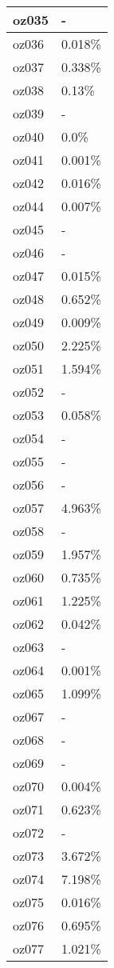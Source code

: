 \documentclass{article}%
\begin{document}
\begin{longtabu}{X[l] X[r]}
\hline%
oz035&{-}\\%
\hline%
oz036&0.018\%\\%
\hline%
oz037&0.338\%\\%
\hline%
oz038&0.13\%\\%
\hline%
oz039&{-}\\%
\hline%
oz040&0.0\%\\%
\hline%
oz041&0.001\%\\%
\hline%
oz042&0.016\%\\%
\hline%
oz044&0.007\%\\%
\hline%
oz045&{-}\\%
\hline%
oz046&{-}\\%
\hline%
oz047&0.015\%\\%
\hline%
oz048&0.652\%\\%
\hline%
oz049&0.009\%\\%
\hline%
oz050&2.225\%\\%
\hline%
oz051&1.594\%\\%
\hline%
oz052&{-}\\%
\hline%
oz053&0.058\%\\%
\hline%
oz054&{-}\\%
\hline%
oz055&{-}\\%
\hline%
oz056&{-}\\%
\hline%
oz057&4.963\%\\%
\hline%
oz058&{-}\\%
\hline%
oz059&1.957\%\\%
\hline%
oz060&0.735\%\\%
\hline%
oz061&1.225\%\\%
\hline%
oz062&0.042\%\\%
\hline%
oz063&{-}\\%
\hline%
oz064&0.001\%\\%
\hline%
oz065&1.099\%\\%
\hline%
oz067&{-}\\%
\hline%
oz068&{-}\\%
\hline%
oz069&{-}\\%
\hline%
oz070&0.004\%\\%
\hline%
oz071&0.623\%\\%
\hline%
oz072&{-}\\%
\hline%
oz073&3.672\%\\%
\hline%
oz074&7.198\%\\%
\hline%
oz075&0.016\%\\%
\hline%
oz076&0.695\%\\%
\hline%
oz077&1.021\%\\%

\end{longtabu}
\end{document}
